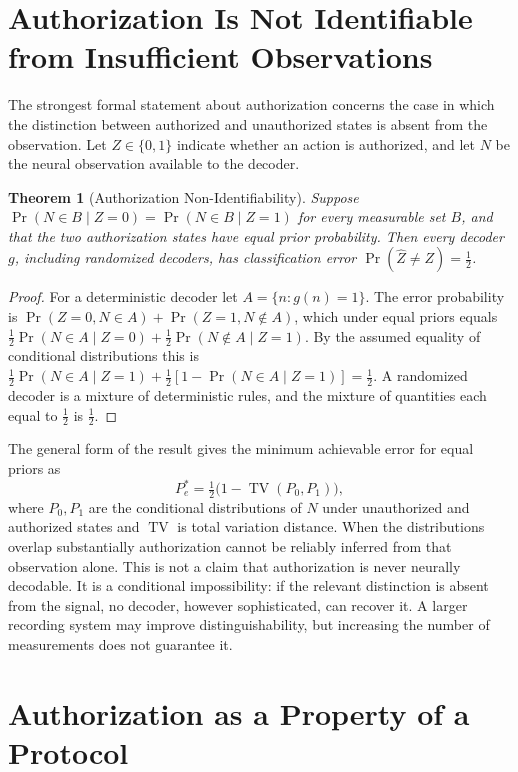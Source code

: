 \documentclass[11pt,twoside,openany]{book}
\newtheorem{theorem}{Theorem}[chapter]
\theoremstyle{definition}
\theoremstyle{remark}
\DeclareMathOperator{\TV}{TV}
\begin{document}
\section{Authorization Is Not Identifiable from Insufficient Observations}

The strongest formal statement about authorization concerns the case in which the distinction between authorized and unauthorized states is absent from the observation. Let $Z\in\{0,1\}$ indicate whether an action is authorized, and let $N$ be the neural observation available to the decoder.

\begin{theorem}[Authorization Non-Identifiability]\label{thm:authnonid}
Suppose $\Pr(N\in B\mid Z=0)=\Pr(N\in B\mid Z=1)$ for every measurable set $B$, and that the two authorization states have equal prior probability. Then every decoder $g$, including randomized decoders, has classification error $\Pr(\widehat Z\neq Z)=\tfrac12$.
\end{theorem}
\begin{proof}
For a deterministic decoder let $A=\{n:g(n)=1\}$. The error probability is $\Pr(Z=0,N\in A)+\Pr(Z=1,N\notin A)$, which under equal priors equals $\tfrac12\Pr(N\in A\mid Z=0)+\tfrac12\Pr(N\notin A\mid Z=1)$. By the assumed equality of conditional distributions this is $\tfrac12\Pr(N\in A\mid Z=1)+\tfrac12\left[1-\Pr(N\in A\mid Z=1)\right]=\tfrac12$. A randomized decoder is a mixture of deterministic rules, and the mixture of quantities each equal to $\tfrac12$ is $\tfrac12$.
\end{proof}

The general form of the result gives the minimum achievable error for equal priors as
\[
P_e^{*}=\tfrac12\bigl(1-\TV(P_0,P_1)\bigr),
\]
where $P_0,P_1$ are the conditional distributions of $N$ under unauthorized and authorized states and $\TV$ is total variation distance. When the distributions overlap substantially authorization cannot be reliably inferred from that observation alone. This is not a claim that authorization is never neurally decodable. It is a conditional impossibility: if the relevant distinction is absent from the signal, no decoder, however sophisticated, can recover it. A larger recording system may improve distinguishability, but increasing the number of measurements does not guarantee it.

\section{Authorization as a Property of a Protocol}
\end{document}
